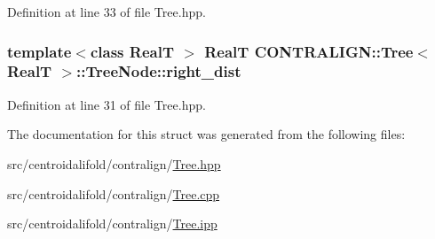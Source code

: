Definition at line 33 of file Tree.\+hpp.

\hypertarget{struct_c_o_n_t_r_a_l_i_g_n_1_1_tree_1_1_tree_node_ab216db550a42f2a12765635b113d07b4}{
\subsubsection[{right\+\_\+dist}]{\setlength{\rightskip}{0pt plus 5cm}template$<$class Real\+T $>$ Real\+T {\bf C\+O\+N\+T\+R\+A\+L\+I\+G\+N\+::\+Tree}$<$ Real\+T $>$\+::Tree\+Node\+::right\+\_\+dist}}\label{struct_c_o_n_t_r_a_l_i_g_n_1_1_tree_1_1_tree_node_ab216db550a42f2a12765635b113d07b4}


Definition at line 31 of file Tree.\+hpp.



The documentation for this struct was generated from the following files\+:\begin{DoxyCompactItemize}
\item 
src/centroidalifold/contralign/\hyperlink{_tree_8hpp}{Tree.\+hpp}\item 
src/centroidalifold/contralign/\hyperlink{_tree_8cpp}{Tree.\+cpp}\item 
src/centroidalifold/contralign/\hyperlink{_tree_8ipp}{Tree.\+ipp}\end{DoxyCompactItemize}
